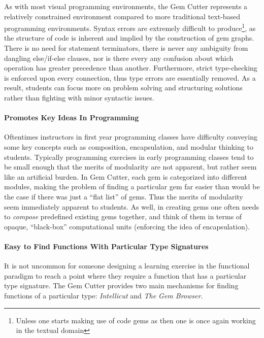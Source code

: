As with most visual programming environments, the Gem Cutter represents a relatively constrained environment compared to more traditional text-based programming environments.  Syntax errors are extremely difficult to produce\footnote{Unless one starts making use of code gems as then one is once again working in the textual domain}, as the structure of code is inherent and implied by the construction of gem graphs.  There is no need for statement terminators, there is never any ambiguity from dangling else/if-else clauses, nor is there every any confusion about which operation has greater precedence than another.  Furthermore, strict type-checking is enforced upon every connection, thus type errors are essentially removed.  As a result, students can focus more on problem solving and structuring solutions rather than fighting with minor syntactic issues.

\paragraph{Promotes Key Ideas In Programming}

Oftentimes instructors in first year programming classes have difficulty conveying some key concepts such as composition, encapsulation, and modular thinking to students.  Typically programming exercises in early programming classes tend to be small enough that the merits of modularity are not apparent, but rather seem like an artificial burden.  In Gem Cutter, each gem is categorized into different modules, making the problem of finding a particular gem far easier than would be the case if there was just a ``flat list'' of gems.  Thus the merits of modularity seem immediately apparent to students.  As well, in creating gems one often needs to \emph{compose} predefined existing gems together, and think of them in terms of opaque, ``black-box'' computational units (enforcing the idea of encapsulation).

\paragraph{Easy to Find Functions With Particular Type Signatures}

It is not uncommon for someone designing a learning exercise in the functional paradigm to reach a point where they require a function that has a particular type signature.  The Gem Cutter provides two main mechanisms for finding functions of a particular type: \emph{Intellicut} and \emph{The Gem Browser}.  

